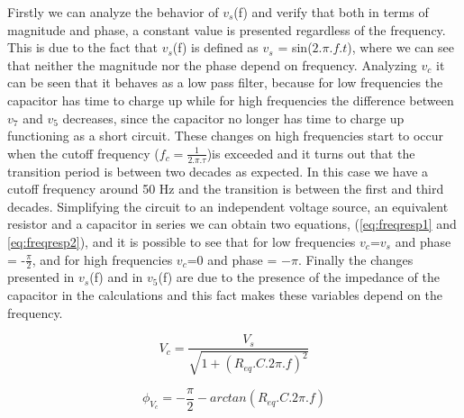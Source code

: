 Firstly we can analyze the behavior of $v_s$(f) and verify that both in terms of magnitude and phase, a constant value is presented regardless of the frequency. This is due to the fact that $v_s$(f) is defined as $v_s$ = sin($2$.$\pi$.$f$.$t$), where we can see that neither the magnitude nor the phase depend on frequency.
Analyzing $v_c$ it can be seen that it behaves as a low pass filter, because for low frequencies the capacitor has time to charge up while for high frequencies the difference between $v_7$ and $v_5$ decreases, since the capacitor no longer has time to charge up functioning as a short circuit. These changes on high frequencies start to occur when the cutoff frequency ($f_c = \frac{1}{2.\pi.\tau}$)is exceeded and it turns out that the transition period is between two decades as expected. In this case we have a cutoff frequency around 50 Hz and the transition is between the first and third decades. 
Simplifying the circuit to an independent voltage source, an equivalent resistor and a capacitor in series we can obtain two equations, (\ref{eq:freqresp1} and \ref{eq:freqresp2}), and it is possible to see that for low frequencies $v_c$=$v_s$ and phase = -$\frac{\pi}{2}$, and for high frequencies $v_c$=$0$ and phase = $-\pi$.
Finally the changes presented in $v_s$(f) and in $v_5$(f) are due to the presence of the impedance of the capacitor in the calculations and this fact makes these variables depend on the frequency. 

\begin{equation}
  V_c = \frac{V_s}{\sqrt{1 + (R_{eq}.C.2\pi.f)^2}}
  \label{eq:freqresp1}
\end{equation}

\begin{equation}
  \phi_{V_c} = -\frac{\pi}{2} - arctan(R_{eq}.C.2\pi.f)
  \label{eq:freqresp2}
\end{equation}















